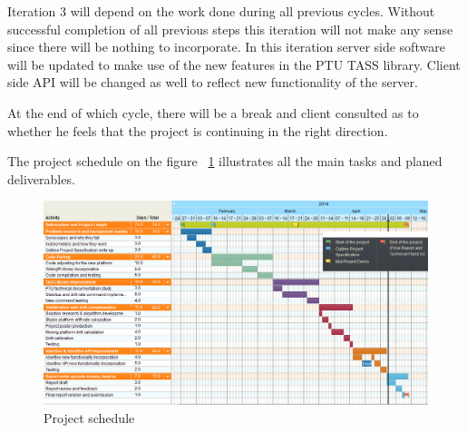 Iteration 3 will depend on the work done during all previous cycles. Without successful completion of all previous steps this iteration will not make any sense since there will be nothing to incorporate. In this iteration server side software will be updated to make use of the new features in the PTU TASS library. Client side API will be changed as well to reflect new functionality of the server.

At the end of which cycle, there will be a break and client consulted as to whether he feels that the project is continuing in the right direction.


The project schedule on the figure ~\ref{fig:ProjectSchedule} illustrates all the main tasks and planed deliverables.

\begin{landscape}
\begin{figure}[H] 
\centering
\centerline{\includegraphics[scale=0.8]{./images/ProjectSchedule}}
\caption{Project schedule}
\label{fig:ProjectSchedule}
\end{figure}
\end{landscape}